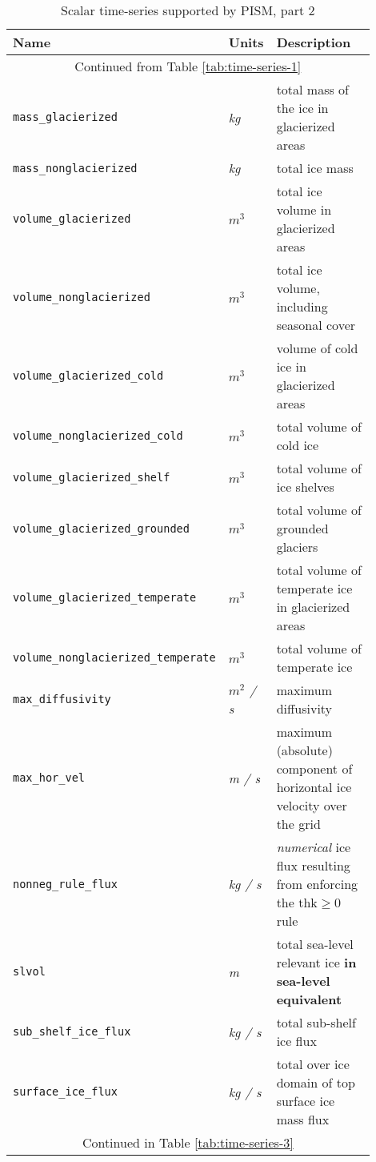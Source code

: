 \begin{table}[ht]
  \centering
 \begin{tabular}{p{0.4\linewidth}p{0.1\linewidth}p{0.4\linewidth}}
    \toprule
    \textbf{Name} & \textbf{Units} & \textbf{Description}\\
    \midrule
    \multicolumn{3}{c}{Continued from Table \ref{tab:time-series-1}}\\
    \texttt{mass_glacierized} & \textsl{kg} &  total mass of the ice in glacierized areas \\
    \texttt{mass_nonglacierized} & \textsl{kg} &  total ice mass \\
    \texttt{volume_glacierized} & \textsl{$m^{3}$} &  total ice volume in glacierized areas \\
    \texttt{volume_nonglacierized} & \textsl{$m^{3}$} &  total ice volume, including seasonal cover \\
    \texttt{volume_glacierized_cold} & \textsl{$m^{3}$} &  volume of cold ice in glacierized areas \\
    \texttt{volume_nonglacierized_cold} & \textsl{$m^{3}$} &  total volume of cold ice \\
    \texttt{volume_glacierized_shelf} & \textsl{$m^{3}$} &  total volume of ice shelves \\
    \texttt{volume_glacierized_grounded} & \textsl{$m^{3}$} &  total volume of grounded glaciers \\
    \texttt{volume_glacierized_temperate} & \textsl{$m^{3}$} &  total volume of temperate ice in glacierized areas \\
    \texttt{volume_nonglacierized_temperate} & \textsl{$m^{3}$} &  total volume of temperate ice \\
    \texttt{max_diffusivity} & \textsl{$m^{2}$  / s} &  maximum diffusivity \\
    \texttt{max_hor_vel} & \textsl{m  / s} &  maximum (absolute) component of horizontal ice velocity over the grid \\
    \texttt{nonneg_rule_flux} & \textsl{kg  / s} &  \emph{numerical} ice flux resulting from enforcing the $\mathrm{thk} \ge 0$ rule \\
    \texttt{slvol} & \textsl{m} &  total sea-level relevant ice \textbf{in sea-level equivalent} \\
    \texttt{sub_shelf_ice_flux} & \textsl{kg  / s} &  total sub-shelf ice flux \\
    \texttt{surface_ice_flux} & \textsl{kg  / s} &  total over ice domain of top surface ice mass flux \\
    \multicolumn{3}{c}{Continued in Table \ref{tab:time-series-3}}\\
    \bottomrule
  \end{tabular}
\caption{Scalar time-series supported by PISM, part 2}
\label{tab:time-series-2}
\end{table}

